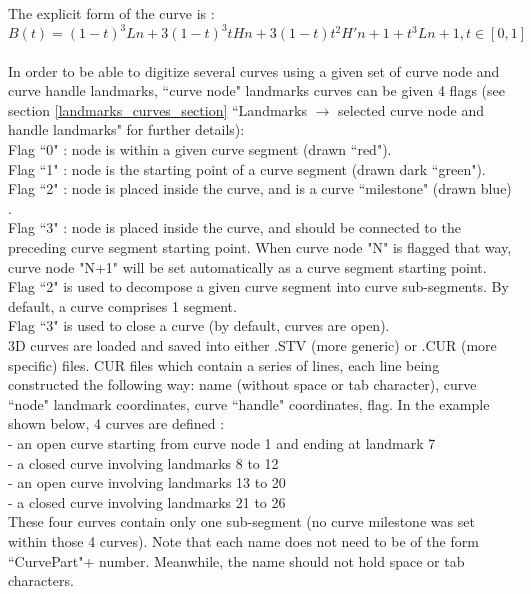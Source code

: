 The explicit form of the curve is :
\begin{equation}
B(t) = (1-t)^{3}Ln + 3(1-t)^{3}tHn + 3(1-t)t^{2}H'n+1 +t^{3}Ln+1, t \in[0,1]
\end{equation}
\\
In order to be able to digitize several curves using a given set of curve node and curve handle landmarks,
``curve node" landmarks curves can be given 4 flags (see section \ref{landmarks_curves_section} ``Landmarks $\rightarrow$ selected curve node and handle landmarks" for further details):\\
Flag ``0" : node is within a given curve segment (drawn ``red").\\
Flag ``1" : node is the starting point of a curve segment (drawn dark ``green").\\
Flag ``2" : node is placed inside the curve, and is a curve ``milestone" (drawn blue) .\\
Flag ``3" : node is placed inside the curve, and should be connected to the preceding curve
segment starting point. When curve node "N" is flagged that way, curve node "N+1" will be set automatically as a curve segment starting point.\\
Flag ``2" is used to decompose a given curve segment into curve sub-segments. By default, a curve comprises 1 segment.\\
Flag ``3" is used to close a curve (by default, curves are open).\\
3D curves are loaded and saved into either .STV (more generic) or .CUR (more specific) files. CUR files which contain a series of lines, each line being
constructed the following way: name (without space or tab character), curve ``node" landmark
coordinates, curve ``handle" coordinates, flag.
In the example shown below, 4 curves are defined :\\
- an open curve starting from curve node 1 and ending at landmark 7\\
- a closed curve involving landmarks 8 to 12\\
- an open curve involving landmarks 13 to 20\\
- a closed curve involving landmarks 21 to 26\\
These four curves contain only one sub-segment (no curve milestone was set within those 4 curves).
Note that each name does not need to be of the form ``CurvePart"+ number. Meanwhile, the name
should not hold space or tab characters.
